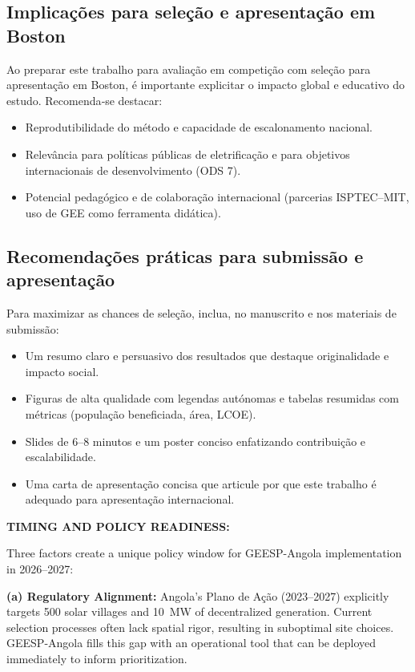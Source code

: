 \documentclass[12pt, a4paper]{article}
\begin{document}
{{{{{{{{{{{{\subsection{Implicações para seleção e apresentação em Boston}
Ao preparar este trabalho para avaliação em competição com seleção para apresentação em Boston, é importante explicitar o impacto global e educativo do estudo. Recomenda‑se destacar:
\begin{itemize}
    \item Reprodutibilidade do método e capacidade de escalonamento nacional.
    \item Relevância para políticas públicas de eletrificação e para objetivos internacionais de desenvolvimento (ODS 7).
    \item Potencial pedagógico e de colaboração internacional (parcerias ISPTEC–MIT, uso de GEE como ferramenta didática).
\end{itemize}

\subsection{Recomendações práticas para submissão e apresentação}
Para maximizar as chances de seleção, inclua, no manuscrito e nos materiais de submissão:
\begin{itemize}
    \item Um resumo claro e persuasivo dos resultados que destaque originalidade e impacto social.
    \item Figuras de alta qualidade com legendas autónomas e tabelas resumidas com métricas (população beneficiada, área, LCOE).
    \item Slides de 6–8 minutos e um poster conciso enfatizando contribuição e escalabilidade.
    \item Uma carta de apresentação concisa que articule por que este trabalho é adequado para apresentação internacional.
\end{itemize}

\noindent\textbf{TIMING AND POLICY READINESS:}

Three factors create a unique policy window for GEESP-Angola implementation in 2026--2027:

\textbf{(a) Regulatory Alignment:} Angola's Plano de Ação (2023--2027) explicitly targets 500 solar villages and 10~MW of decentralized generation. Current selection processes often lack spatial rigor, resulting in suboptimal site choices. GEESP-Angola fills this gap with an operational tool that can be deployed immediately to inform prioritization.

}}}}}}}}}}}}
\end{document}
